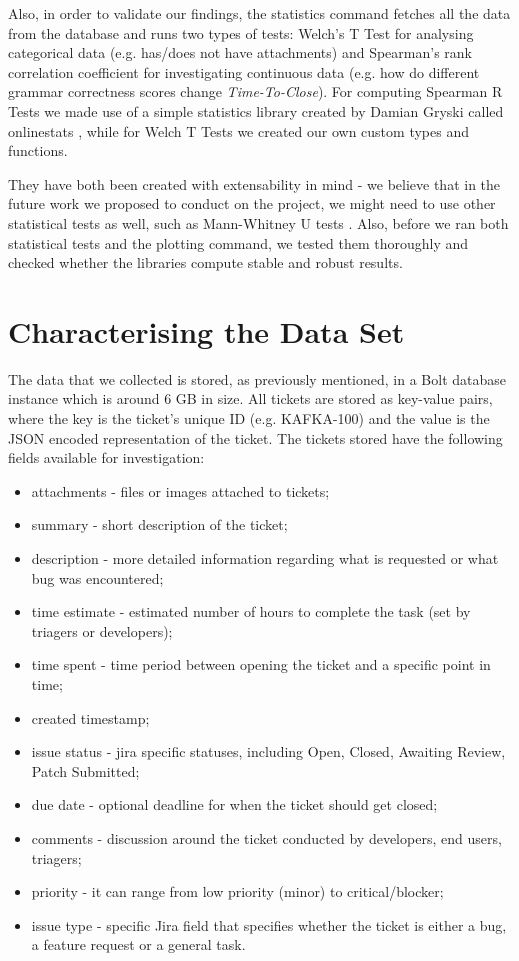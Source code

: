 \documentclass{mpaper}
\begin{document}
Also, in order to validate our findings, the statistics command fetches all the data from the database and runs two types of 
tests: Welch's T Test \cite{welch1947generalization} for analysing categorical data (e.g. has/does not have attachments)
and Spearman's rank correlation coefficient \cite{spearman1904proof} for investigating continuous data (e.g. how do different 
grammar correctness scores change \emph{Time-To-Close}). For computing Spearman R Tests we made use of a simple 
statistics library created by Damian Gryski called onlinestats \cite{onlinestats}, while for Welch T Tests we created our 
own custom types and functions. 

They have both been created with extensability in mind - we believe that in the future work we proposed to conduct on the 
project, we might need to use other statistical tests as well, such as Mann-Whitney U tests \cite{mann1947test}. Also, before
we ran both statistical tests and the plotting command, we tested them thoroughly and checked whether the libraries compute 
stable and robust results.

\section{Characterising the Data Set}\label{characterising}

The data that we collected is stored, as previously mentioned, in a Bolt database instance which is around 6 GB in size. 
All tickets are stored as key-value pairs, where the key is the ticket's unique ID (e.g. KAFKA-100) and the value is the 
JSON encoded representation of the ticket. The tickets stored have the following fields available for investigation:
\begin{itemize}
  \item attachments - files or images attached to tickets;
  \item summary - short description of the ticket;
  \item description - more detailed information regarding what is requested or what bug was encountered;
  \item time estimate - estimated number of hours to complete the task (set by triagers or developers);
  \item time spent - time period between opening the ticket and a specific point in time;
  \item created timestamp;
  \item issue status - jira specific statuses, including Open, Closed, Awaiting Review, Patch Submitted;
  \item due date - optional deadline for when the ticket should get closed;
  \item comments - discussion around the ticket conducted by developers, end users, triagers;
  \item priority - it can range from low priority (minor) to critical/blocker;
  \item issue type - specific Jira field that specifies whether the ticket is either a bug, a feature request or a general task.
\end{itemize}
\end{document}
